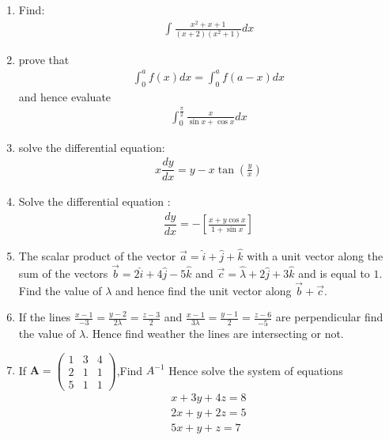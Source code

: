 \documentclass[12pt,-letter paper]{article}
\providecommand{\sbrak}[1]{\ensuremath{{}\left[#1\right]}}
\providecommand{\brak}[1]{\ensuremath{\left(#1\right)}}
\theoremstyle{remark}
\newcommand{\myvec}[1]{\ensuremath{\begin{pmatrix}#1\end{pmatrix}}}
\let\vec\mathbf
\begin{document}
\begin{enumerate}
\item Find: \begin{align*}\int{\frac{x^2+x+1}{\brak{x+2}\brak{x^2+1}}}dx\end{align*}

\item prove that 
\begin{align*}
    \int_{0}^{a} f\brak{x}dx = \int_{0}^{a} f\brak{a-x}dx
\end{align*}
and hence evaluate 
\begin{align*}
\int_{0}^{\frac{\pi}{2}}\frac{x}{{\sin x}+{\cos x}}dx
\end{align*}

\item solve the differential equation: 
\begin{align*}
{x}\dfrac{dy}{dx}= {y}-{x}\tan\brak{\frac{y}{x}}
\end{align*}

\item Solve the differential equation : 
\begin{align*}
\dfrac{dy}{dx}= -\sbrak{\frac{x+y\cos x}{1+\sin x}}
\end{align*}

\item The scalar product of the vector $\overrightarrow{a} = \hat{i}+\hat{j}+\hat{k}$ with a unit vector along the sum of the vectors $\overrightarrow{b} = 2\hat{i}+4\hat{j}-5\hat{k}$ and $\overrightarrow{c} = \hat{\lambda}+2\hat{j}+3\hat{k}$ and is equal to $1$. Find the value of $\lambda$ and hence find the unit vector along $\overrightarrow{b}+\overrightarrow{c}$.

\item If the lines $\frac{x-1}{-3}=\frac{y-2}{2\lambda}=\frac{z-3}{2}$ and $\frac{x-1}{3\lambda}=\frac{y-1}{2}=\frac{z-6}{-5}$ are perpendicular find the value of $\lambda$. Hence find weather the lines are intersecting or not.

\item If ${\vec{A}} = \myvec{1&3&4\\2&1&1\\5&1&1}$,Find $A^{-1}$
        Hence solve the system of equations 
            \begin{align*}
                {x+3y+4z}=8 \\
                {2x+y+2z}=5 \\
                {5x+y+z} =7
            \end{align*}    
                

\end{enumerate}
\end{document}

